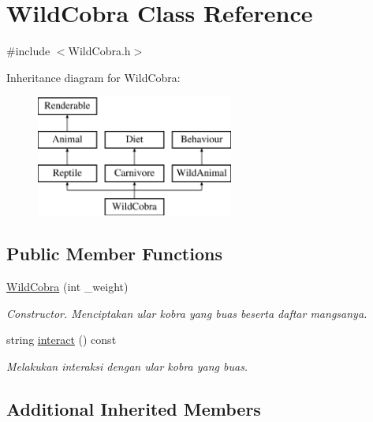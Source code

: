 \hypertarget{classWildCobra}{\section{Wild\+Cobra Class Reference}
\label{classWildCobra}
}


{\ttfamily \#include $<$Wild\+Cobra.\+h$>$}

Inheritance diagram for Wild\+Cobra\+:\begin{figure}[H]
\begin{center}
\leavevmode
\includegraphics[height=4.000000cm]{classWildCobra}
\end{center}
\end{figure}
\subsection*{Public Member Functions}
\begin{DoxyCompactItemize}
\item 
\hypertarget{classWildCobra_a1a3170e5204edc488a88d2b1f26f8a5e}{\hyperlink{classWildCobra_a1a3170e5204edc488a88d2b1f26f8a5e}{Wild\+Cobra} (int \+\_\+weight)}\label{classWildCobra_a1a3170e5204edc488a88d2b1f26f8a5e}

\begin{DoxyCompactList}\small\item\em Constructor. Menciptakan ular kobra yang buas beserta daftar mangsanya. \end{DoxyCompactList}\item 
string \hyperlink{classWildCobra_ad1426b5e8ddc1ffbb830020623cb2a84}{interact} () const 
\begin{DoxyCompactList}\small\item\em Melakukan interaksi dengan ular kobra yang buas. \end{DoxyCompactList}\end{DoxyCompactItemize}
\subsection*{Additional Inherited Members}


